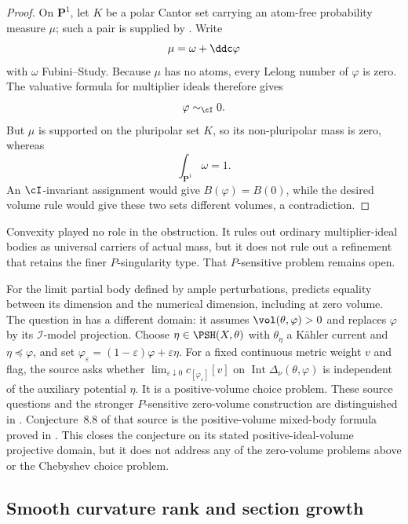 \begin{proof}
On $\mathbf P^1$, let $K$ be a polar Cantor set carrying an atom-free
probability measure $\mu$; such a pair is supplied by \cite[p.~31]{Car83}.
Write
\[
                         \mu=\omega+\ddc\varphi
\]
with $\omega$ Fubini--Study.
Because $\mu$ has no atoms, every Lelong number of $\varphi$ is zero.
The valuative formula for multiplier ideals therefore gives
\[
                              \varphi\sim_{\cI}0.
\]
But $\mu$ is supported on the pluripolar set $K$, so its
non-pluripolar mass is zero, whereas
\[
                       \int_{\mathbf P^1}\omega=1.
\]
An $\cI$-invariant assignment would give
$B(\varphi)=B(0)$, while the desired volume rule would give these two sets
different volumes, a contradiction.
\end{proof}

Convexity played no role in the obstruction.
It rules out ordinary multiplier-ideal bodies as universal carriers of
actual mass, but it does not rule out a refinement that retains the finer
$P$-singularity type.
That $P$-sensitive problem remains open.

For the limit partial body defined by ample perturbations,
\cite[Section~5.6 and Conjecture~5.29]{Xia21} predicts equality between
its dimension and the numerical dimension, including at zero volume.
The question in \cite[Section~6.4, p.~1325]{Xia21} has a different domain:
it assumes $\vol(\theta,\varphi)>0$ and replaces $\varphi$ by its
$\mathcal I$-model projection.  Choose $\eta\in\PSH(X,\theta)$ with
$\theta_\eta$ a K\"ahler current and $\eta\preceq\varphi$, and set
$\varphi_\varepsilon=(1-\varepsilon)\varphi+\varepsilon\eta$.
For a fixed continuous metric weight $v$ and flag, the source asks whether
$\lim_{\varepsilon\downarrow0}c_{[\varphi_\varepsilon]}[v]$
on $\operatorname{Int}\Delta_\nu(\theta,\varphi)$ is independent of
the auxiliary potential $\eta$.  It is a positive-volume choice problem.
These source questions and the stronger $P$-sensitive zero-volume
construction are distinguished in .
Conjecture~8.8 of that source is the positive-volume mixed-body formula
proved in .  This closes the conjecture on its
stated positive-ideal-volume projective domain, but it does not address any
of the zero-volume problems above or the Chebyshev choice problem.

\subsection*{Smooth curvature rank and section growth}

